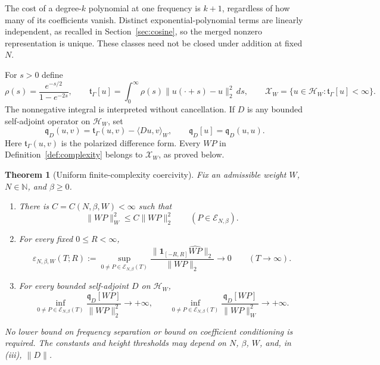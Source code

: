 \documentclass[11pt]{article}
\newtheorem{theorem}{Theorem}[section]
\theoremstyle{definition}
\theoremstyle{remark}
\newcommand{\N}{\mathbb N}
\newcommand{\HH}{\mathcal H_W}
\newcommand{\XX}{\mathcal X_W}
\newcommand{\EE}{\mathcal E_{N,\beta}}
\newcommand{\tg}{\mathfrak t_\Gamma}
\newcommand{\qD}{\mathfrak q_D}
\newcommand{\ip}[2]{\langle #1,#2\rangle}
\newcommand{\norm}[1]{\lVert #1\rVert}
\begin{document}
The cost of a degree-$k$ polynomial at one frequency is $k+1$, regardless
of how many of its coefficients vanish. Distinct exponential-polynomial
terms are linearly independent, as recalled in Section~\ref{sec:cosine},
so the merged nonzero representation is unique. These classes need not be
closed under addition at fixed $N$.

For $s>0$ define
\begin{equation}\label{eq:gamma-form}
 \rho(s)=\frac{e^{-s/2}}{1-e^{-2s}},\qquad
 \tg[u]=\int_0^\infty\rho(s)\norm{u(\cdot+s)-u}_2^2\,ds,
 \qquad \XX=\{u\in\HH:\tg[u]<\infty\}.
\end{equation}
The nonnegative integral is interpreted without cancellation. If $D$ is
any bounded self-adjoint operator on $\HH$, set
\begin{equation}\label{eq:q}
 \qD(u,v)=\tg(u,v)-\ip{Du}{v}_W,\qquad
 \qD[u]=\qD(u,u).
\end{equation}
Here $\tg(u,v)$ is the polarized difference form. Every $WP$ in
Definition~\ref{def:complexity} belongs to $\XX$, as proved below.

\begin{theorem}[Uniform finite-complexity coercivity]\label{thm:main}
Fix an admissible weight $W$, $N\in\N$, and $\beta\ge0$.
\begin{enumerate}[label=\textup{(\roman*)},leftmargin=2.1em]
\item There is $C=C(N,\beta,W)<\infty$ such that
\begin{equation}\label{eq:comparison}
 \norm{WP}_W^2\le C\norm{WP}_2^2\qquad(P\in\EE).
\end{equation}
\item For every fixed $0\le R<\infty$,
\begin{equation}\label{eq:escape}
 \varepsilon_{N,\beta,W}(T;R):=
 \sup_{0\ne P\in\EE(T)}
 \frac{\norm{\mathbf1_{[-R,R]}\widehat{WP}}_2}{\norm{WP}_2}
 \longrightarrow0\qquad(T\to\infty).
\end{equation}
\item For every bounded self-adjoint $D$ on $\HH$,
\begin{equation}\label{eq:coercivity}
 \inf_{0\ne P\in\EE(T)}\frac{\qD[WP]}{\norm{WP}_2^2}
 \longrightarrow+\infty,\qquad
 \inf_{0\ne P\in\EE(T)}\frac{\qD[WP]}{\norm{WP}_W^2}
 \longrightarrow+\infty.
\end{equation}
\end{enumerate}
No lower bound on frequency separation or bound on coefficient
conditioning is required. The constants and height thresholds may depend
on $N$, $\beta$, $W$, and, in \textup{(iii)}, $\norm D$.
\end{theorem}
\end{document}
